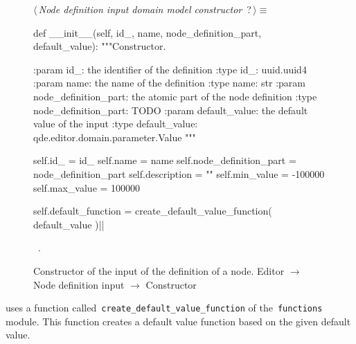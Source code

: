 \documentclass[%
    a4paper,    %
    justified,  %
    nobib,      %
    openany     %
]{tufte-book}
\begin{document}
\begin{figure}
\begin{flushleft} \small
\begin{minipage}{\linewidth}\label{scrap135}\raggedright\small
{} $\langle\,${\itshape Node definition input domain model constructor}\nobreak\ {\footnotesize {?}}$\,\rangle\equiv$
\vspace{-1ex}
\begin{pythoncode}
def __init__(self, id_, name, node_definition_part, default_value):
    """Constructor.

    :param id_: the identifier of the definition
    :type  id_: uuid.uuid4
    :param name: the name of the definition
    :type  name: str
    :param node_definition_part: the atomic part of the node definition
    :type node_definition_part: TODO
    :param default_value: the default value of the input
    :type default_value: qde.editor.domain.parameter.Value
    """

    self.id_                  = id_
    self.name                 = name
    self.node_definition_part = node_definition_part
    self.description          = ""
    self.min_value            = -100000
    self.max_value            = 100000

    self.default_function = create_default_value_function(
        default_value
    )|\NWsep|
\end{pythoncode}
\vspace{1.5ex}
\footnotesize
\begin{list}{}{\setlength{\itemsep}{-\parsep}\setlength{\itemindent}{-\leftmargin}}
\item \NWtxtMacroRefIn\ .

\item{}
\end{list}
\end{minipage}\vspace{4ex}
\end{flushleft}
\caption{Constructor of the input of the definition of a node.
  \newline{}\newline{}Editor $\rightarrow$ Node definition input $\rightarrow$
  Constructor}
\label{editor:lst:node-definition-input:constructor}
\end{figure}

 uses a function called~\verb=create_default_value_function= of
the~\verb=functions= module. This function creates a default value function
based on the given default value.
\end{document}
